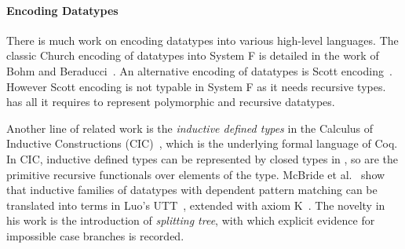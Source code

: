 \paragraph{Encoding Datatypes}
There is much work on encoding datatypes into various high-level
languages. The classic Church encoding of datatypes into System F is
detailed in the work of Bohm and Beraducci~\cite{Bohm1985}.  An
alternative encoding of datatypes is Scott
encoding~\cite{encoding:scott}. However Scott encoding is not typable
in System F as it needs recursive types. \name has all it requires to
represent polymorphic and recursive datatypes.

Another line of related work is the \emph{inductive defined types} in
the Calculus of Inductive Constructions (CIC)~\cite{cic}, which is the
underlying formal language of Coq. In CIC, inductive defined types can
be represented by closed types in \coc, so are the primitive recursive
functionals over elements of the type. McBride et
al.~\cite{elim:pi:pattern} show that inductive families of datatypes
with dependent pattern matching can be translated into terms in Luo's
UTT~\cite{Luo:UTT}, extended with axiom K~\cite{axiomK}. The novelty
in his work is the introduction of \emph{splitting tree}, with which
explicit evidence for impossible case branches is recorded.
